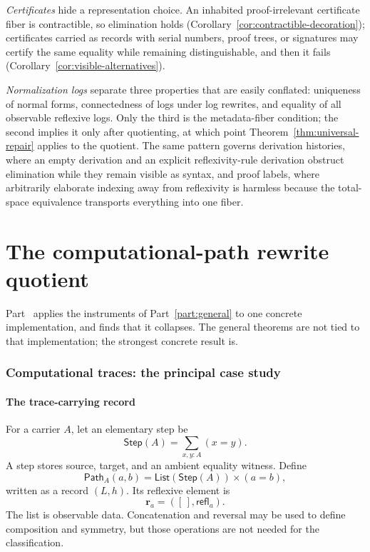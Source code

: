 \documentclass[10pt,reqno]{amsart}
\newcommand{\Step}{\mathsf{Step}}
\newcommand{\PathTy}{\mathsf{Path}}
\newcommand{\refl}{\mathsf{refl}}
\newcommand{\List}{\mathsf{List}}
\newcommand{\Empty}{[\,]}
\begin{document}
\emph{Certificates} hide a representation choice.  An inhabited proof-irrelevant
certificate fiber is contractible, so elimination holds
(Corollary~\ref{cor:contractible-decoration}); certificates carried as records
with serial numbers, proof trees, or signatures may certify the same equality
while remaining distinguishable, and then it fails
(Corollary~\ref{cor:visible-alternatives}).

\emph{Normalization logs} separate three properties that are easily conflated:
uniqueness of normal forms, connectedness of logs under log rewrites, and
equality of all observable reflexive logs.  Only the third is the metadata-fiber
condition; the second implies it only after quotienting, at which point
Theorem~\ref{thm:universal-repair} applies to the quotient.  The same pattern
governs derivation histories, where an empty derivation and an explicit
reflexivity-rule derivation obstruct elimination while they remain visible as
syntax, and proof labels, where arbitrarily elaborate indexing away from
reflexivity is harmless because the total-space equivalence transports
everything into one fiber.

\part{The computational-path rewrite quotient}
\label{part:case-study}

Part~\ref{part:case-study} applies the instruments of Part~\ref{part:general} to
one concrete implementation, and finds that it collapses.  The general theorems
are not tied to that implementation; the strongest concrete result is.


\section{Computational traces: the principal case study}
\label{sec:traces}

\subsection{The trace-carrying record}

For a carrier \(A\), let an elementary step be
\[
       \Step(A)=\sum_{x,y:A}(x=y).
\tag{9.1}\label{eq:step}
\]
A step stores source, target, and an ambient equality witness.  Define
\[
       \PathTy_A(a,b)
       =\List(\Step(A))\times(a=b),
\tag{9.2}\label{eq:path}
\]
written as a record \((L,h)\).  Its reflexive element is
\[
                         \mathbf r_a=(\Empty,\refl_a).
\tag{9.3}\label{eq:empty-refl}
\]
The list is observable data.  Concatenation and reversal may be used to define
composition and symmetry, but those operations are not needed for the
classification.
\end{document}
